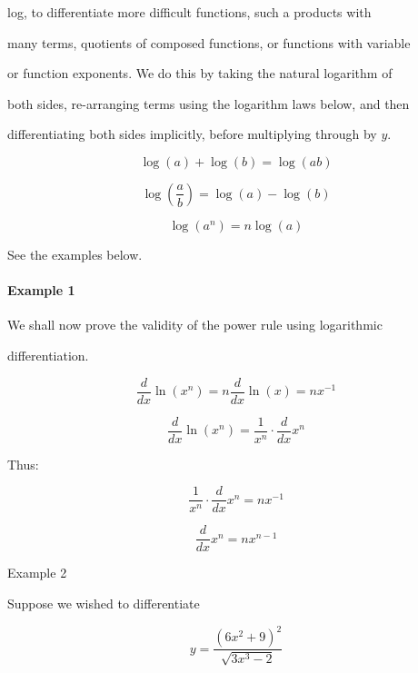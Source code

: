 log, to differentiate more difficult functions, such a products with

many terms, quotients of composed functions, or functions with variable

or function exponents. We do this by taking the natural logarithm of

both sides, re-arranging terms using the logarithm laws below, and then

differentiating both sides implicitly, before multiplying through by $y$.



 $$\log(a)+\log(b)=\log(ab)$$                     



 $$\log\left(\frac{a}{b}\right)=\log(a)-\log(b)$$ 



 $$\log(a^n)=n\log(a)$$                           



See the examples below.



\paragraph{Example 1}



We shall now prove the validity of the power rule using logarithmic

differentiation.



$$\frac{d}{dx}\ln(x^n)=n\frac{d}{dx}\ln(x)=nx^{-1}$$



$$\frac{d}{dx}\ln(x^n)=\frac{1}{x^n}\cdot\frac{d}{dx}x^n$$



Thus:



$$\frac{1}{x^n}\cdot\frac{d}{dx}x^n=nx^{-1}$$



$$\frac{d}{dx}x^n=nx^{n-1}$$



Example 2



Suppose we wished to differentiate   

                                                                                                    

$$y=\frac{(6x^2+9)^2}{\sqrt{3x^3-2}}$$



